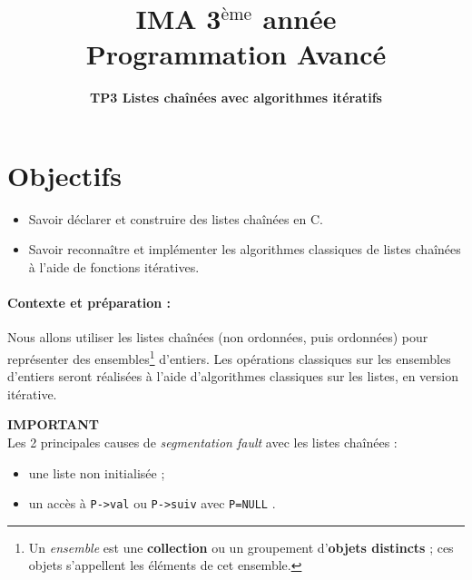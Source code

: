 \documentclass[final, pdftex, a4paper, openbib, ]{article}
\title{IMA 3$^{\mbox{\`eme}}$ année\\ Programmation Avancé
}
\author{\huge \textbf{TP3 Listes chaînées avec algorithmes itératifs}}
\date{}
\begin{document}
\posttitle{\par\end{center}}
\setlength{\droptitle}{-45pt}
\maketitle

\vspace{-1.7cm}
\section{Objectifs}

\begin{itemize}
	\item Savoir déclarer et construire des listes chaînées en C.
	\item Savoir reconnaître et implémenter les algorithmes classiques de listes chaînées à l'aide de fonctions itératives.
\end{itemize}


\paragraph{Contexte et préparation : } Nous allons utiliser les listes chaînées (non ordonnées, puis ordonnées) pour représenter des ensembles\footnote{Un \textit{ensemble} est une \textbf{collection} ou un groupement d'\textbf{objets distincts} ; ces objets s'appellent les éléments de cet ensemble.} d'entiers. Les opérations classiques sur les ensembles d'entiers seront réalisées à l'aide d'algorithmes classiques sur les listes, en version itérative.

\begin{alertinfo}{}
	\textbf{IMPORTANT}\\Les 2 principales causes de \textit{segmentation fault} avec les listes chaînées :
	\begin{itemize}
		\item une liste non initialisée ;
		\item un accès à \texttt{P->val} ou \texttt{P->suiv} avec \texttt{P=NULL} .
	\end{itemize}
\end{alertinfo}
\end{document}
